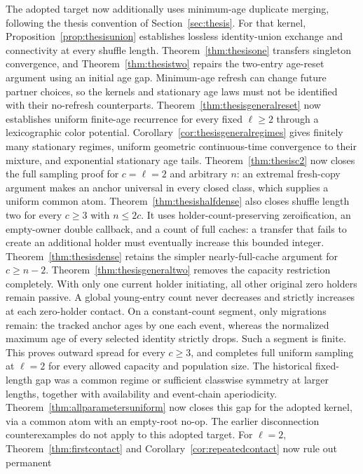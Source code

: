\documentclass[11pt]{article}
\begin{document}
The adopted target now additionally uses minimum-age duplicate
merging, following the thesis convention of Section~\ref{sec:thesis}.
For that kernel, Proposition~\ref{prop:thesisunion} establishes
lossless identity-union exchange and connectivity at every
shuffle length. Theorem~\ref{thm:thesisone} transfers singleton
convergence, and Theorem~\ref{thm:thesistwo} repairs the
two-entry age-reset argument using an initial age gap.
Minimum-age refresh can change future partner choices, so
the kernels and stationary age laws must not be identified
with their no-refresh counterparts.
Theorem~\ref{thm:thesisgeneralreset} now establishes uniform
finite-age recurrence for every fixed $\ell\ge2$ through a
lexicographic color potential. Corollary~\ref{cor:thesisgeneralregimes}
gives finitely many stationary regimes, uniform geometric
continuous-time convergence to their mixture, and exponential
stationary age tails.
Theorem~\ref{thm:thesisc2} now closes the full sampling
proof for $c=\ell=2$ and arbitrary $n$: an extremal
fresh-copy argument makes an anchor universal in every
closed class, which supplies a uniform common atom.
Theorem~\ref{thm:thesishalfdense} also closes shuffle
length two for every $c\ge3$ with $n\le2c$.
It uses holder-count-preserving zeroification, an
empty-owner double callback, and a count of full caches:
a transfer that fails to create an additional holder
must eventually increase this bounded integer.
Theorem~\ref{thm:thesisdense} retains the simpler
nearly-full-cache argument for $c\ge n-2$.
Theorem~\ref{thm:thesisgeneraltwo} removes the capacity
restriction completely. With only one current holder
initiating, all other original zero holders remain
passive. A global young-entry count never decreases
and strictly increases at each zero-holder contact.
On a constant-count segment, only migrations remain:
the tracked anchor ages by one each event, whereas
the normalized maximum age of every selected identity
strictly drops. Such a segment is finite. This proves
outward spread for every $c\ge3$, and completes full
uniform sampling at $\ell=2$ for every allowed capacity
and population size.
The historical fixed-length gap was a common regime or
sufficient classwise symmetry at larger lengths, together with
availability and event-chain aperiodicity.
Theorem~\ref{thm:allparametersuniform} now closes this gap for
the adopted kernel, via a common atom with an empty-root no-op.
The earlier disconnection counterexamples
do not apply to this adopted target.
For $\ell=2$, Theorem~\ref{thm:firstcontact} and
Corollary~\ref{cor:repeatedcontact} now rule out permanent
\end{document}
